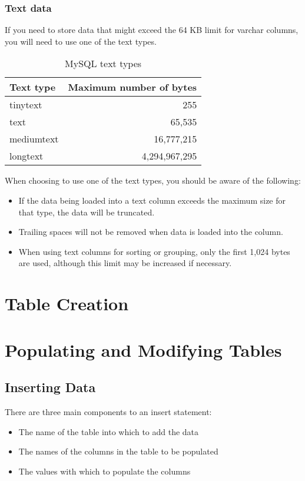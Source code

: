 \subsubsection*{Text data}
If you need to store data that might exceed the 64 KB limit for varchar columns, you will need to use one of the text types.
\begin{table}
    \centering
    \caption{MySQL text types}
    \label{tbl2-1}
    \begin{tabular}{lr}
        \hline
        Text type  & Maximum number of bytes \\
        \hline
        tinytext   & 255                     \\
        text       & 65,535                  \\
        mediumtext & 16,777,215              \\
        longtext   & 4,294,967,295           \\
        \hline
    \end{tabular}
\end{table}

When choosing to use one of the text types, you should be aware of the following:
\begin{itemize}
    \item If the data being loaded into a text column exceeds the maximum size for that type, the data will be truncated.
    \item Trailing spaces will not be removed when data is loaded into the column.
    \item When using text columns for sorting or grouping, only the first 1,024 bytes are used, although this limit may be increased if necessary.
\end{itemize}

\section{Table Creation}
\section{Populating and Modifying Tables}
\subsection{Inserting Data}
There are three main components to an insert statement:
\begin{itemize}
    \item The name of the table into which to add the data
    \item The names of the columns in the table to be populated
    \item The values with which to populate the columns
\end{itemize}
